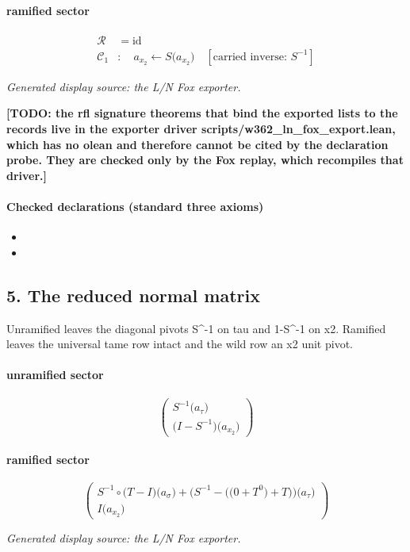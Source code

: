 \paragraph{ramified sector}
\[\begin{aligned}\mathcal R&=\mathrm{id}\\\mathcal C_{1}&:\quad a_{x_{2}}\leftarrow S\bigl(a_{x_{2}}\bigr)\quad[\text{carried inverse: }S^{-1}]\end{aligned}\]
\par\noindent\emph{Generated display source: the L/N Fox exporter.}
\par\noindent\textbf{[TODO: the rfl signature theorems that bind the exported lists to the records live in the exporter driver scripts/w362\_ln\_fox\_export.lean, which has no olean and therefore cannot be cited by the declaration probe. They are checked only by the Fox replay, which recompiles that driver.]}
\paragraph{Checked declarations (standard three axioms)}
\begin{itemize}
\item {}
\item {}
\end{itemize}

\subsection*{5. The reduced normal matrix}
Unramified leaves the diagonal pivots S\textasciicircum{}-1 on tau and 1-S\textasciicircum{}-1 on x2. Ramified leaves the universal tame row intact and the wild row an x2 unit pivot.

\paragraph{unramified sector}
\[\begin{pmatrix}S^{-1}\bigl(a_{\tau}\bigr)\\\bigl(I-S^{-1}\bigr)\bigl(a_{x_{2}}\bigr)\end{pmatrix}\]
\paragraph{ramified sector}
\[\begin{pmatrix}S^{-1}\circ \bigl(T-I\bigr)\bigl(a_{\sigma}\bigr)+\bigl(S^{-1}-\bigl(\bigl(0+T^{0}\bigr)+T\bigr)\bigr)\bigl(a_{\tau}\bigr)\\I\bigl(a_{x_{2}}\bigr)\end{pmatrix}\]
\par\noindent\emph{Generated display source: the L/N Fox exporter.}
